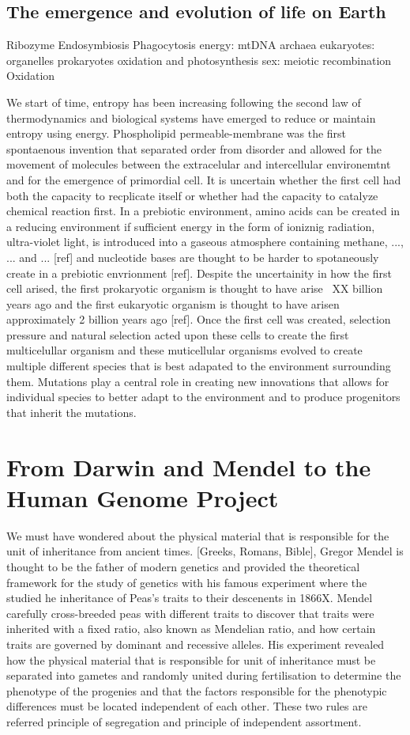 \subsection{The emergence and evolution of life on Earth}

Ribozyme
Endosymbiosis
Phagocytosis
energy: mtDNA
archaea
eukaryotes: organelles
prokaryotes
oxidation and photosynthesis
sex: meiotic recombination
Oxidation

We start of time, entropy has been increasing following the second law of thermodynamics and biological systems have emerged to reduce or maintain entropy using energy. Phospholipid permeable-membrane was the first spontaenous invention that separated order from disorder and allowed for the movement of molecules between the extracelular and intercellular environemtnt and for the emergence of primordial cell. It is uncertain whether the first cell had both the capacity to recplicate itself or whether had the capacity to catalyze chemical reaction first. In a prebiotic environment, amino acids can be created in a reducing environment if sufficient energy in the form of ioniznig radiation, ultra-violet light, is introduced into a gaseous atmosphere containing methane, ..., ... and ... [ref] and nucleotide bases are thought to be harder to spotaneously create in a prebiotic envrionment [ref]. Despite the uncertainity in how the first cell arised, the first prokaryotic organism is thought to have arise ~XX billion years ago and the first eukaryotic organism is thought to have arisen approximately 2 billion years ago [ref]. Once the first cell was created, selection pressure and natural selection acted upon these cells to create the first multicelullar organism and these muticellular organisms evolved to create multiple different species that is best adapated to the environment surrounding them. Mutations play a central role in creating new innovations that allows for individual species to better adapt to the environment and to produce progenitors that inherit the mutations. 
\section{From Darwin and Mendel to the Human Genome Project}


We must have wondered about the physical material that is responsible for the unit of inheritance from ancient times\cite{}. [Greeks, Romans, Bible], Gregor Mendel is thought to be the father of modern genetics and provided the theoretical framework for the study of genetics with his famous experiment where the studied he inheritance of Peas's traits to their descenents in 1866X.  Mendel carefully cross-breeded peas with different traits to discover that traits were inherited with a fixed ratio, also known as Mendelian ratio, and how certain traits are governed by dominant and recessive alleles. His experiment revealed how the physical material that is responsible for unit of inheritance must be separated into gametes and randomly united during fertilisation to determine the phenotype of the progenies and that the factors responsible for the phenotypic differences must be located independent of each other. These two rules are referred principle of segregation and principle of independent assortment.
